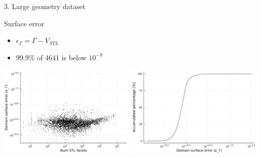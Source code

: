 \documentclass{beamer}
\begin{document}
\begin{frame}{3. Large geometry dataset}

  \begin{block}{Surface error}
  \begin{itemize}
    \item
      $\epsilon_\Gamma = \Gamma - V_{STL}$
    \item
      99.9\% of 4641 is below $10^{-9}$
  \end{itemize}
  \end{block}

  \includegraphics[width=0.49\textwidth]{../analysis/plots/num_stl_facets_surface_error}
  \includegraphics[width=0.49\textwidth]{../analysis/plots/histogram_surface_error}
\end{frame}
\end{document}
